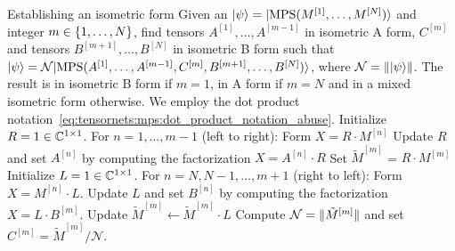 \begin{Algorithm}{Establishing an isometric form}{
    \label{algo:tensornets:mps:mixed_isometric_form}
    Given an  $\ket{\psi} = \ket{\text{MPS}(M^{[1]},\dots,M^{[N]})}$ and integer $m \in\set{1,\dots,N}$, find tensors $A^{[1]},\dots,A^{[m-1]}$ in isometric A form, $C^{[m]}$ and tensors $B^{[m+1]},\dots,B^{[N]}$ in isometric B form such that $\ket{\psi} = \mathcal{N} \ket{\text{MPS}(A^{[1]},\dots,A^{[m-1]},C^{[m]},B^{[m+1]},\dots,B^{[N]})}$, where $\mathcal{N} = \norm{\psiket}$.
    The result is in isometric B form if $m=1$, in A form if $m=N$ and in a mixed isometric form otherwise.
    We employ the dot product notation~\eqref{eq:tensornets:mps:dot_product_notation_abuse}.
}
    \step Initialize $R = 1 \in \mathbb{C}^{1 \times 1}$.
    \step For $n=1,\dots, m-1$ (left to right):
    \step \quad Form $X = R \cdot M^{[n]}$
    \step \quad Update $R$ and set $A^{[n]}$ by computing the  factorization $X = A^{[n]} \cdot R$
    \step Set $\tilde{M}^{[m]}$ = $R \cdot M^{[m]}$
    \step Initialize $L = 1 \in \mathbb{C}^{1 \times 1}$.
    \step For $n=N,N-1,\dots,m+1$ (right to left):
    \step \quad Form $X = M^{[n]} \cdot L$.
    \step \quad Update $L$ and set $B^{[n]}$ by computing the  factorization $X = L \cdot B^{[m]}$.
    \step Update $\tilde{M}^{[m]} \gets \tilde{M}^{[m]} \cdot L$
    \step Compute $\mathcal{N} = \norm{\tilde{M}^{[m]}}$ and set $C^{[m]} = \tilde{M}^{[m]} / \mathcal{N}$.
\end{Algorithm}

